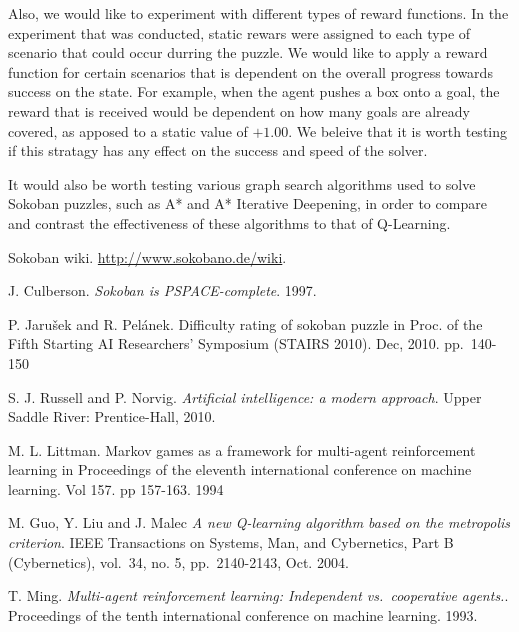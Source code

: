 \documentclass[times, 10pt,twocolumn]{article}
\begin{document}
Also, we would like to experiment with different types of reward functions.  In the experiment that was conducted, static rewars were assigned to each type of scenario that could occur durring the puzzle.  We would like to apply a reward function for certain scenarios that is dependent on the overall progress towards success on the state.  For example, when the agent pushes a box onto a goal, the reward that is received would be dependent on how many goals are already covered, as apposed to a static value of $+1.00$.  We beleive that it is worth testing if this stratagy has any effect on the success and speed of the solver.

It would also be worth testing various graph search algorithms used to solve Sokoban puzzles, such as A* and A* Iterative Deepening, in order to compare and contrast the effectiveness of these algorithms to that of Q-Learning.


\appendix
\listoffigures
\listoftables




\begin{thebibliography}{9}
Sokoban wiki.
\url{http://www.sokobano.de/wiki}.


J. Culberson. 
\textit{Sokoban is PSPACE-complete}.
1997.

P. Jarušek and R. Pelánek.
Difficulty rating of sokoban puzzle
in Proc. of the Fifth Starting AI Researchers' Symposium (STAIRS 2010).
Dec, 2010. pp.~140-150

S. J. Russell and P. Norvig.
\textit{Artificial intelligence: a modern approach}.
Upper Saddle River: Prentice-Hall, 2010.

M. L. Littman.
Markov games as a framework for multi-agent
reinforcement learning in Proceedings of the eleventh international
conference on machine learning. Vol 157. pp 157-163. 1994

M. Guo, Y. Liu and J. Malec
\textit{A new Q-learning algorithm based on the metropolis criterion}.
IEEE Transactions on Systems, Man, and Cybernetics, Part B (Cybernetics), vol.~34, no. 5, pp.~2140-2143, Oct. 2004.

T. Ming.
\textit{Multi-agent reinforcement learning: Independent vs.~cooperative agents.}.
Proceedings of the tenth international conference on machine learning. 1993.

\end{thebibliography}
\end{document}
